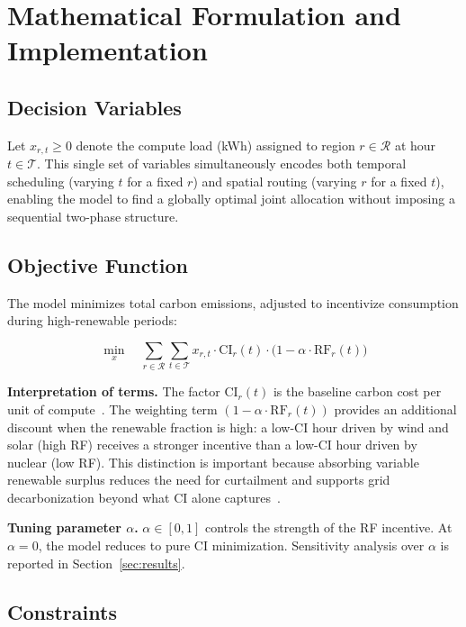 \section{Mathematical Formulation and Implementation}
\label{sec:formulation}

\subsection{Decision Variables}

Let $x_{r,t} \geq 0$ denote the compute load (kWh) assigned to region $r \in \mathcal{R}$ at hour $t \in \mathcal{T}$.
This single set of variables simultaneously encodes both temporal scheduling (varying $t$ for a fixed $r$) and spatial routing (varying $r$ for a fixed $t$), enabling the model to find a globally optimal joint allocation without imposing a sequential two-phase structure.

\subsection{Objective Function}

The model minimizes total carbon emissions, adjusted to incentivize consumption during high-renewable periods:

\begin{equation}
  \min_{x} \quad \sum_{r \in \mathcal{R}} \sum_{t \in \mathcal{T}}
    x_{r,t} \cdot \mathrm{CI}_r(t) \cdot \bigl(1 - \alpha \cdot \mathrm{RF}_r(t)\bigr)
  \label{eq:objective}
\end{equation}

\textbf{Interpretation of terms.}
The factor $\mathrm{CI}_r(t)$ is the baseline carbon cost per unit of compute~\cite{radovanovic2023}.
The weighting term $(1 - \alpha \cdot \mathrm{RF}_r(t))$ provides an additional discount when the renewable fraction is high: a low-CI hour driven by wind and solar (high RF) receives a stronger incentive than a low-CI hour driven by nuclear (low RF).
This distinction is important because absorbing variable renewable surplus reduces the need for curtailment and supports grid decarbonization beyond what CI alone captures~\cite{liu2012, riepin2024spatiotemporal}.

\textbf{Tuning parameter $\alpha$.}
$\alpha \in [0, 1]$ controls the strength of the RF incentive.
At $\alpha = 0$, the model reduces to pure CI minimization.
Sensitivity analysis over $\alpha$ is reported in Section~\ref{sec:results}.

\subsection{Constraints}

